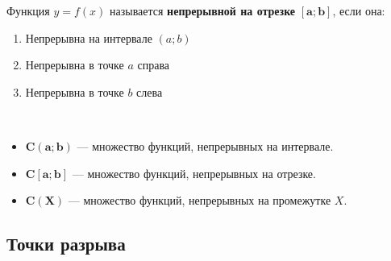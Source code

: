 \begin{definition}
  Функция $y = f(x) $ называется \textbf{непрерывной на отрезке} $\bm{[a; b]}$, если она:
  \begin{enumerate}
    \item Непрерывна на интервале $(a; b)$
    \item Непрерывна в точке $a$ справа
    \item Непрерывна в точке $b$ слева
  \end{enumerate}
\end{definition}
\begin{note}\ \\ \vspace{-2\topsep}
\begin{itemize}
  \item $\bm{C(a; b)}$ --- множество функций, непрерывных на интервале. 
  \item $\bm{C[a; b]}$ --- множество функций, непрерывных на отрезке. 
  \item $\bm{C(X)}$ --- множество функций, непрерывных на промежутке $X$. 
\end{itemize}
\end{note}

\subsection{Точки разрыва}

